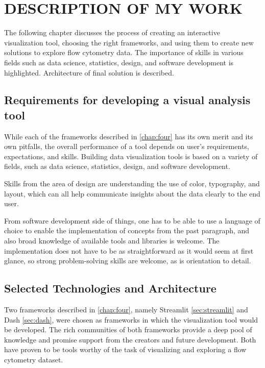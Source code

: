 \chapter{DESCRIPTION OF MY WORK}
\label{chap:five}
The following chapter discusses the process of creating an interactive visualization tool, choosing the right frameworks, and using them to create new solutions to explore flow cytometry data. The importance of skills in various fields such as data science, statistics, design, and software development is highlighted. Architecture of final solution is described.

\section{Requirements for developing a visual analysis tool}
\label{sec:req}
While each of the frameworks described in \ref{chap:four} has its own merit and its own pitfalls, the overall performance of a tool depends on user's requirements, expectations, and skills. Building data visualization tools is based on a variety of fields, such as data science, statistics, design, and software development. 

Skills from the area of design are understanding the use of color, typography, and layout, which can all help communicate insights about the data clearly to the end user. 

From software development side of things, one has to be able to use a language of choice to enable the implementation of concepts from the past paragraph, and also broad knowledge of available tools and libraries is welcome. The implementation does not have to be as straightforward as it would seem at first glance, so strong problem-solving skills are welcome, as is orientation to detail. 

\section{Selected Technologies and Architecture}
\label{sec:selected_technologies}
Two frameworks described in \ref{chap:four}, namely Streamlit \ref{sec:streamlit} and Dash \ref{sec:dash}, were chosen as frameworks in which the visualization tool would be developed. The rich communities of both frameworks provide a deep pool of knowledge and promise support from the creators and future development. Both have proven to be tools worthy of the task of visualizing and exploring a flow cytometry dataset. 

